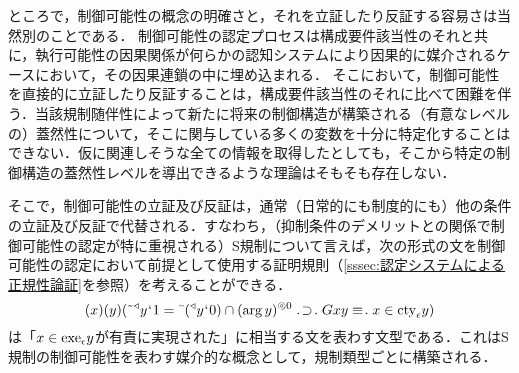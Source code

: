 ところで，制御可能性の概念の明確さと，それを立証したり反証する容易さは当然別のことである．
制御可能性の認定プロセスは構成要件該当性のそれと共に，執行可能性の因果関係が何らかの認知システムにより因果的に媒介されるケースにおいて，その因果連鎖の中に埋め込まれる．
そこにおいて，制御可能性を直接的に立証したり反証することは，構成要件該当性のそれに比べて困難を伴う．当該規制随伴性によって新たに将来の制御構造が構築される（有意なレベルの）蓋然性について，そこに関与している多くの変数を十分に特定化することはできない．仮に関連しそうな全ての情報を取得したとしても，そこから特定の制御構造の蓋然性レベルを導出できるような理論はそもそも存在しない．

そこで，制御可能性の立証及び反証は，通常（日常的にも制度的にも）他の条件の立証及び反証で代替される．すなわち，（抑制条件のデメリットとの関係で制御可能性の認定が特に重視される）S規制について言えば，次の形式の文を制御可能性の認定において前提として使用する証明規則（\ref{sssec:認定システムによる正規性論証}を参照）を考えることができる．
\[
    (x)(y)(\tildel{\trgl{y}}\fap 1 = \barl{(\trgl{y}\fap 0)}\cap\msec{(\arg y)}{0}\case{1}{1}{1}Gxy\case{3}{0}{1}x\in \cty{\epsilon}y)
\]
は「$ x\in\mathrm{exe}_{\epsilon} y $が有責に実現された」に相当する文を表わす文型である．これはS規制の制御可能性を表わす媒介的な概念として，規制類型ごとに構築される．

